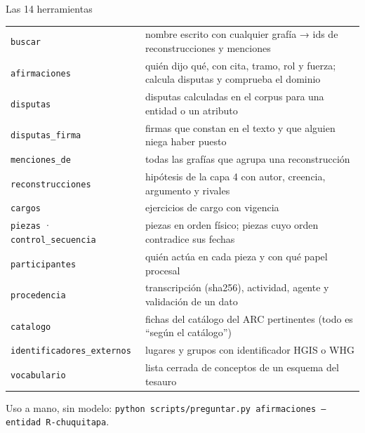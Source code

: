 \documentclass[aspectratio=169,10pt]{beamer}
\newcommand{\ttt}[1]{\texttt{\small #1}}
\begin{document}
\begin{frame}{Las 14 herramientas}
\scriptsize
\begin{tabular}{@{}lp{10.2cm}@{}}
\toprule
\ttt{buscar} & nombre escrito con cualquier grafía → ids de reconstrucciones y menciones \\
\ttt{afirmaciones} & quién dijo qué, con cita, tramo, rol y fuerza; calcula disputas y comprueba el dominio \\
\ttt{disputas} & disputas calculadas en el corpus para una entidad o un atributo \\
\ttt{disputas\_firma} & firmas que constan en el texto y que alguien niega haber puesto \\
\ttt{menciones\_de} & todas las grafías que agrupa una reconstrucción \\
\ttt{reconstrucciones} & hipótesis de la capa 4 con autor, creencia, argumento y rivales \\
\ttt{cargos} & ejercicios de cargo con vigencia \\
\ttt{piezas} · \ttt{control\_secuencia} & piezas en orden físico; piezas cuyo orden contradice sus fechas \\
\ttt{participantes} & quién actúa en cada pieza y con qué papel procesal \\
\ttt{procedencia} & transcripción (sha256), actividad, agente y validación de un dato \\
\ttt{catalogo} & fichas del catálogo del ARC pertinentes (todo es \enquote{según el catálogo}) \\
\ttt{identificadores\_externos} & lugares y grupos con identificador HGIS o WHG \\
\ttt{vocabulario} & lista cerrada de conceptos de un esquema del tesauro \\
\bottomrule
\end{tabular}

\medskip
Uso a mano, sin modelo: \ttt{python scripts/preguntar.py afirmaciones --entidad R-chuquitapa}.
\end{frame}
\end{document}
